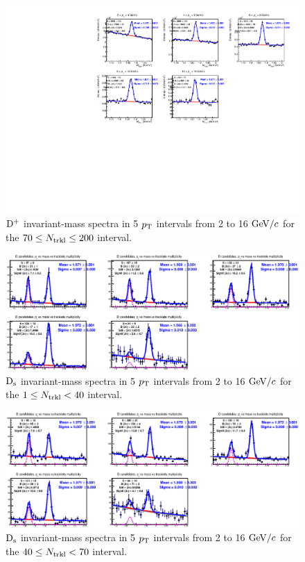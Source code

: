 \begin{figure}[htpb]
\centering
 \includegraphics[width=.9\textwidth]{FigCap6/RawYields_Central_d0Cut_Ntrklts_70_200_sigmafixtoMB.pdf}
 \caption{${\rm D^+}$ invariant-mass spectra in 5 $p_{\rm T}$ intervals from 2 to 16 $\mathrm{GeV}/c$ for the $70 \leq N_{\rm trkl} \leq 200$ interval.}
 \label{fig:DplusInvMassVsNtrkl_3}
\end{figure}

\begin{figure}[htpb]
\centering
 \includegraphics[width=.9\textwidth]{FigCap6/DsMass140.eps}
  \caption{${\rm D_s}$ invariant-mass spectra in 5 $p_{\rm T}$ intervals from 2 to 16 $\mathrm{GeV}/c$ for the $1 \leq N_{\rm trkl} < 40$ interval.}
 \label{fig:DsInvMassVsNtrkl_1}
\end{figure}

\begin{figure}[htpb]
\centering
 \includegraphics[width=.9\textwidth]{FigCap6/DsMass4070.eps}
 \caption{${\rm D_s}$ invariant-mass spectra in 5 $p_{\rm T}$ intervals from 2 to 16 $\mathrm{GeV}/c$ for the $40 \leq N_{\rm trkl} < 70$ interval.}
 \label{fig:DsInvMassVsNtrkl_2}
\end{figure}

